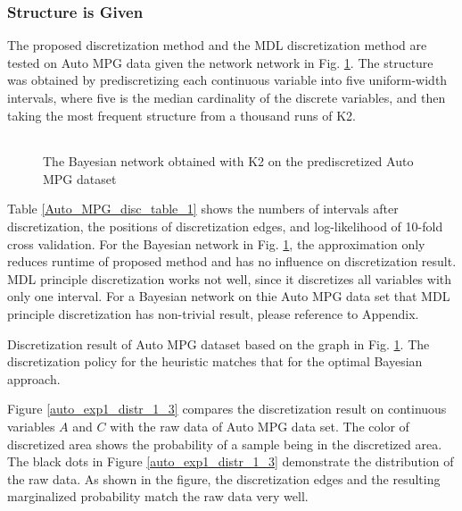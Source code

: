 \subsubsection{Structure is Given}

The proposed discretization method and the MDL discretization method are tested on Auto MPG data given the network network in Fig. \ref{Auto_graph_1}.
The structure was obtained by prediscretizing each continuous variable into five uniform-width intervals, where five is the median cardinality of the discrete variables, and then taking the most frequent structure from a thousand runs of K2.

\begin{figure}[ht]
  \centering
  \begin{tabular}{cc}
    
  \end{tabular}
  \caption{The Bayesian network obtained with K2 on the prediscretized Auto MPG dataset}
  \label{Auto_graph_1}
\end{figure}

Table \ref{Auto_MPG_disc_table_1} shows the numbers of intervals after discretization, the positions of discretization edges, and log-likelihood of 10-fold cross validation. For the Bayesian network in Fig. \ref{Auto_graph_1}, the approximation only reduces runtime of proposed method and has no influence on discretization result. MDL principle discretization works not well, since it discretizes all variables with only one interval. For a Bayesian network on thie Auto MPG data set that MDL principle discretization has non-trivial result, please reference to Appendix.

\begin{table}[h]
  \centering
  
  \caption{Discretization result of Auto MPG dataset based on the graph in Fig. \ref{Auto_graph_1}. The discretization policy for the heuristic matches that for the optimal Bayesian approach. }
  \label{Auto_MPG_disc_table_1}
\end{table}

Figure \ref{auto_exp1_distr_1_3} compares the discretization result on continuous variables $A$ and $C$ with the raw data of Auto MPG data set. The color of discretized area shows the probability of a sample being in the discretized area. The black dots in Figure \ref{auto_exp1_distr_1_3} demonstrate the distribution of the raw data. As shown in the figure, the discretization edges and the resulting marginalized probability match the raw data very well.

